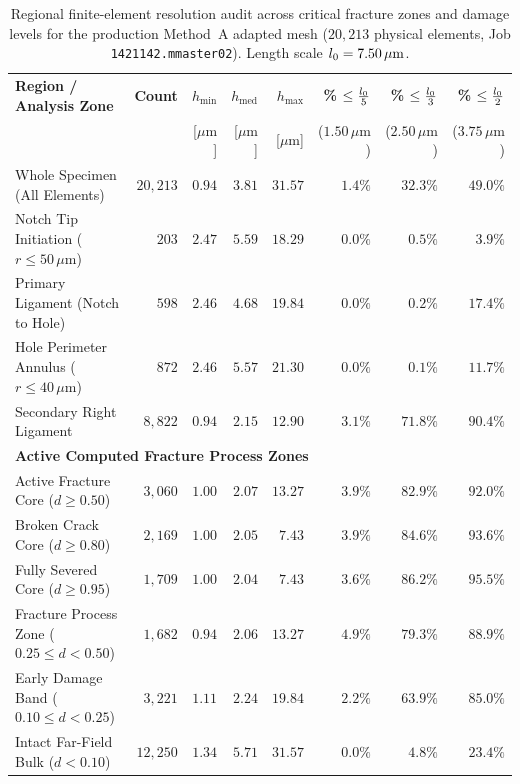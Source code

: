 \begin{table}[htbp]
\centering
\small
\caption{Regional finite-element resolution audit across critical fracture zones and damage levels for the production Method~A adapted mesh ($20{,}213$ physical elements, Job \texttt{1421142.mmaster02}). Length scale $l_0 = 7.50\,\mu\mathrm{m}$.}
\label{tab:regional_mesh_resolution}
\begin{tabularx}{\textwidth}{lrrrrrrr}
\hline
\textbf{Region / Analysis Zone} & \textbf{Count} & \textbf{$h_{\min}$} & \textbf{$h_{\mathrm{med}}$} & \textbf{$h_{\max}$} & \textbf{\% $\le \frac{l_0}{5}$} & \textbf{\% $\le \frac{l_0}{3}$} & \textbf{\% $\le \frac{l_0}{2}$} \\
 & & [$\mu\mathrm{m}$] & [$\mu\mathrm{m}$] & [$\mu\mathrm{m}$] & ($1.50\,\mu\mathrm{m}$) & ($2.50\,\mu\mathrm{m}$) & ($3.75\,\mu\mathrm{m}$) \\
\hline
Whole Specimen (All Elements) & $20{,}213$ & $0.94$ & $3.81$ & $31.57$ & $1.4\%$ & $32.3\%$ & $49.0\%$ \\
Notch Tip Initiation ($r \le 50\,\mu\mathrm{m}$) & $203$ & $2.47$ & $5.59$ & $18.29$ & $0.0\%$ & $0.5\%$ & $3.9\%$ \\
Primary Ligament (Notch to Hole) & $598$ & $2.46$ & $4.68$ & $19.84$ & $0.0\%$ & $0.2\%$ & $17.4\%$ \\
Hole Perimeter Annulus ($r \le 40\,\mu\mathrm{m}$) & $872$ & $2.46$ & $5.57$ & $21.30$ & $0.0\%$ & $0.1\%$ & $11.7\%$ \\
Secondary Right Ligament & $8{,}822$ & $0.94$ & $2.15$ & $12.90$ & $3.1\%$ & $71.8\%$ & $90.4\%$ \\
\hline
\multicolumn{8}{l}{\textbf{Active Computed Fracture Process Zones}} \\
Active Fracture Core ($d \ge 0.50$) & $3{,}060$ & $1.00$ & $2.07$ & $13.27$ & $3.9\%$ & $82.9\%$ & $92.0\%$ \\
Broken Crack Core ($d \ge 0.80$) & $2{,}169$ & $1.00$ & $2.05$ & $7.43$ & $3.9\%$ & $84.6\%$ & $93.6\%$ \\
Fully Severed Core ($d \ge 0.95$) & $1{,}709$ & $1.00$ & $2.04$ & $7.43$ & $3.6\%$ & $86.2\%$ & $95.5\%$ \\
Fracture Process Zone ($0.25 \le d < 0.50$) & $1{,}682$ & $0.94$ & $2.06$ & $13.27$ & $4.9\%$ & $79.3\%$ & $88.9\%$ \\
Early Damage Band ($0.10 \le d < 0.25$) & $3{,}221$ & $1.11$ & $2.24$ & $19.84$ & $2.2\%$ & $63.9\%$ & $85.0\%$ \\
Intact Far-Field Bulk ($d < 0.10$) & $12{,}250$ & $1.34$ & $5.71$ & $31.57$ & $0.0\%$ & $4.8\%$ & $23.4\%$ \\
\hline
\end{tabularx}
\end{table}

